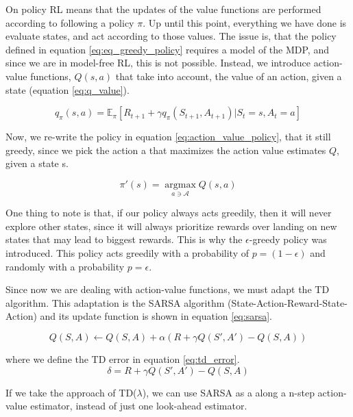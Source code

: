 On policy RL means that the updates of the value functions are performed according to following a policy $\pi$. Up until this point, everything we have done is evaluate states, and act according to those values. The issue is, that the policy defined in equation \ref{eq:eq_greedy_policy} requires a model of the MDP, and since we are in model-free RL, this is not possible. Instead, we introduce action-value functions, $Q(s,a)$ that take into account, the value of an action, given a state (equation \ref{eq:q_value}).

\begin{equation} \label{eq:q_value}
	q_{\pi}(s,a) = \mathbb{E}_{\pi}[R_{t+1} + \gamma q_{\pi}(S_{t+1},A_{t+1}) | S_t=s , A_t=a]
\end{equation}

Now, we re-write the policy in equation \ref{eq:action_value_policy}, that it still greedy, since we pick the action a that maximizes the action value estimates $Q$, given a state s.

\begin{equation} \label{eq:action_value_policy}
	\pi'(s) = \operatorname*{argmax}_{a \ni \mathcal{A}} {Q}(s,a)
\end{equation}

One thing to note is that, if our policy always acts greedily, then it will never explore other states, since it will always prioritize rewards over landing on new states that may lead to biggest rewards. This is why the $\epsilon$-greedy policy was introduced. This policy acts greedily with a probability of $p = (1 - \epsilon)$ and randomly with a probability $p = \epsilon$. 

Since now we are dealing with action-value functions, we must adapt the TD algorithm. This adaptation is the SARSA algorithm (State-Action-Reward-State-Action) and its update function is shown in equation \ref{eq:sarsa}.

\begin{equation} \label{eq:sarsa}
	{Q}(S,A) \leftarrow {Q}(S,A) + \alpha(R + \gamma{Q}(S',A') - {Q}(S,A))
\end{equation}

\noindent where we define the TD error in equation \ref{eq:td_error}.
\begin{equation} \label{eq:td_error}
	\delta = R + \gamma{Q}(S',A') - {Q}(S,A)
\end{equation}

If we take the approach of TD($\lambda$), we can use SARSA as a along a n-step action-value estimator, instead of just one look-ahead estimator. 

